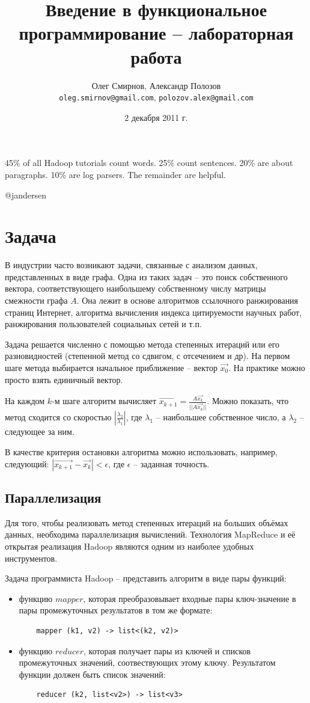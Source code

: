 \documentclass[a4paper,11pt]{article}
\author{Олег Смирнов, Александр Полозов \\
\texttt{oleg.smirnov@gmail.com}, \texttt{polozov.alex@gmail.com}}
\date{2 декабря 2011 г.}
\title{Введение в функциональное программирование -- лабораторная работа \No 2}
\begin{document}
\epigraph{45\% of all Hadoop tutorials count words. 25\% count sentences.
20\% are about paragraphs. 10\% are log parsers. The remainder are 
helpful.}{@jandersen}

\section{Задача}
В индустрии часто возникают задачи, связанные с анализом данных, представленных
в виде графа. Одна из таких задач -- это поиск собственного вектора,
соответствующего наибольшему собственному числу матрицы смежности графа $A$.
Она лежит в основе алгоритмов ссылочного ранжирования страниц Интернет, 
алгоритма вычисления индекса цитируемости научных работ, ранжирования
пользователей социальных сетей и т.п.

Задача решается численно с помощью метода степенных итераций или его
разновидностей (степенной метод со сдвигом, с отсечением и др). На первом шаге
метода выбирается начальное приближение -- вектор $\vec{x_0}$. На практике
можно просто взять единичный вектор.

На каждом $k$-м шаге алгоритм вычисляет $\vec{x_{k+1}} = 
\frac{A \vec{x_k}}{||A \vec{x_k}||}$. Можно показать, что метод сходится
со скоростью $|\frac{\lambda_2}{\lambda_1}|$, где $\lambda_1$ -- наибольшее
собственное число, а $\lambda_2$ -- следующее за ним.

В качестве критерия остановки алгоритма можно использовать, например,
следующий: $|\vec{x_{k+1}} - \vec{x_k}| < \epsilon$, где $\epsilon$ --
заданная точность.

\subsection{Параллелизация}
Для того, чтобы реализовать метод степенных итераций на больших объёмах
данных, необходима параллелизация вычислений. Технология MapReduce и
её открытая реализация Hadoop являются одним из наиболее удобных 
инструментов.

Задача программиста Hadoop -- представить алгоритм в виде пары функций:
\begin{itemize}
\item функцию $mapper$, которая преобразовывает входные пары ключ-значение
  в пары промежуточных результатов в том же формате:
  \begin{lstlisting}
    mapper (k1, v2) -> list<(k2, v2)>
  \end{lstlisting}
\item функцию $reducer$, которая получает пары из ключей и списков 
  промежуточных значений, соотвествующих этому ключу. Результатом функции
  должен быть список значений:
  \begin{lstlisting}
    reducer (k2, list<v2>) -> list<v3>
  \end{lstlisting}
\end{itemize}
\end{document}
